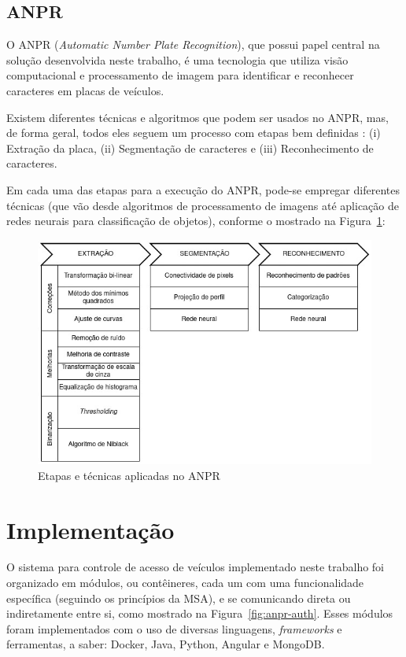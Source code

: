 \documentclass[12pt]{article}
\begin{document}
\subsection{ANPR}

O ANPR (\textit{Automatic Number Plate Recognition}), que possui papel central na solução desenvolvida neste trabalho, é uma tecnologia que utiliza visão computacional e processamento de imagem para identificar e reconhecer caracteres em placas de veículos.

Existem diferentes técnicas e algoritmos que podem ser usados no ANPR, mas, de forma geral, todos eles seguem um processo com etapas bem definidas \cite{mufti2021}: (i) Extração da placa, (ii) Segmentação de caracteres e (iii) Reconhecimento de caracteres.

Em cada uma das etapas para a execução do ANPR, \cite{shashirangana2020} pode-se empregar diferentes técnicas (que vão desde algoritmos de processamento de imagens até aplicação de redes neurais para classificação de objetos), conforme o mostrado na Figura~\ref{fig:anpr-steps}:

\begin{figure}[ht]
	\centering
	\includegraphics[width=1\textwidth]{anpr-steps.jpg}
	\caption{Etapas e técnicas aplicadas no ANPR}
	\label{fig:anpr-steps}
\end{figure} 

\section{Implementação}

O sistema para controle de acesso de veículos implementado neste trabalho foi organizado em módulos, ou contêineres, cada um com uma funcionalidade específica (seguindo os princípios da MSA), e se comunicando direta ou indiretamente entre si, como mostrado na Figura~\ref{fig:anpr-auth}. Esses módulos foram implementados com o uso de diversas linguagens, \textit{frameworks} e ferramentas, a saber: Docker, Java, Python, Angular e MongoDB.
\end{document}
